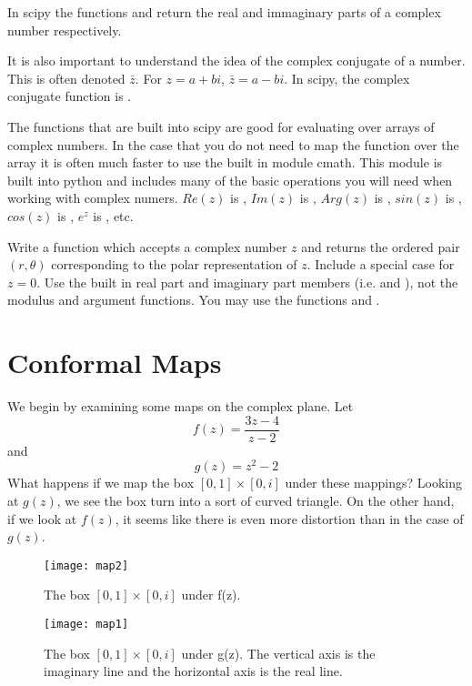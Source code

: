 In scipy the functions  and  return the real and immaginary parts of a complex number respectively.

It is also important to understand the idea of the complex conjugate of a number. This is often denoted $\bar{z}$. For $z=a+bi$, $\bar{z}=a-bi$. In scipy, the complex conjugate function is .

The functions that are built into scipy are good for evaluating over arrays of complex numbers. In the case that you do not need to map the function over the array it is often much faster to use the built in module cmath. This module is built into python and includes many of the basic operations you will need when working with complex numers. $Re(z)$ is , $Im(z)$ is , $Arg(z)$ is , $sin(z)$ is , $cos(z)$ is , $e^z$ is , etc.

\begin{problem}
Write a function which accepts a complex number $z$ and returns the ordered pair $(r,\theta)$ corresponding to the polar representation of $z$. Include a special case for $z=0$. Use the built in real part and imaginary part members (i.e.  and ), not the modulus and argument functions. You may use the functions  and .
\end{problem}

\section*{Conformal Maps}

We begin by examining some maps on the complex plane.  Let
\[
f(z) = \frac{3z - 4}{z - 2}
\]
and
\[
g(z) = z^2 - 2
\]
What happens if we map the box $[0,1]\times[0,i]$ under these mappings?
\newpage
Looking at $g(z)$, we see the box turn into a sort of curved triangle.  On the other hand, if we look at $f(z)$, it seems like there is even more distortion than in the case of $g(z)$.

\begin{figure}
\begin{center}
\texttt{[image: map2]}
\caption{The box $[0,1]\times[0,i]$ under f(z).}
\end{center}
\end{figure}

\begin{figure}
\begin{center}
\texttt{[image: map1]}
\caption{The box $[0,1]\times[0,i]$ under g(z).  The vertical axis is the imaginary line and the horizontal axis is the real line.}
\end{center}
\end{figure}

